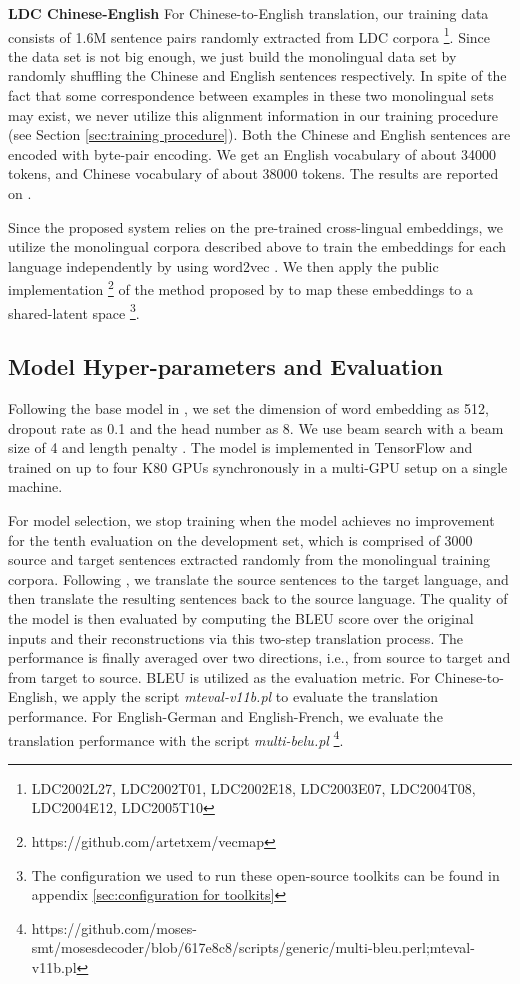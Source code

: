 \documentclass[11pt,a4paper]{article}
\begin{document}
\textbf{LDC Chinese-English} For Chinese-to-English translation, our training data consists of 1.6M sentence pairs randomly extracted from LDC corpora \footnote{LDC2002L27, LDC2002T01, LDC2002E18, LDC2003E07, LDC2004T08, LDC2004E12, LDC2005T10}. Since the data set is not big enough, we just build the monolingual data set by randomly shuffling the Chinese and English sentences respectively. In spite of the fact that some correspondence between examples in these two monolingual sets may exist, we never utilize this alignment information in our training procedure (see Section \ref{sec:training procedure}). Both the Chinese and English sentences are encoded with byte-pair encoding. We get an English vocabulary of about 34000 tokens, and Chinese vocabulary of about 38000 tokens. The results are reported on .

Since the proposed system relies on the pre-trained cross-lingual embeddings, we utilize the monolingual corpora described above to train the embeddings for each language independently by using word2vec \cite{mikolov2013distributed}. We then apply the public implementation \footnote{https://github.com/artetxem/vecmap} of the method proposed by \cite{Artetxe2017Learning} to map these embeddings to a shared-latent space \footnote{The configuration we used to run these open-source toolkits can be found in appendix \ref{sec:configuration for toolkits}}.

\subsection{Model Hyper-parameters and Evaluation}
Following the base model in \cite{Vaswani2017Attention}, we set the dimension of word embedding as 512, dropout rate as 0.1 and the head number as 8. We use beam search with a beam size of 4 and length penalty . The model is implemented in TensorFlow \cite{tensorflow2015-whitepaper} and trained on up to four K80 GPUs synchronously in a multi-GPU setup on a single machine.

For model selection, we stop training when the model achieves no improvement for the tenth evaluation on the development set, which is comprised of 3000 source and target sentences extracted randomly from the monolingual training corpora. Following \cite{Lample2017Unsupervised}, we translate the source sentences to the target language, and then translate the resulting sentences back to the source language. The quality of the model is then evaluated by computing the BLEU score over the original inputs and their reconstructions via this two-step translation process. The performance is finally averaged over two directions, i.e., from source to target and from target to source. BLEU \cite{papineni2002bleu:02} is utilized as the evaluation metric. For Chinese-to-English, we apply the script \emph{mteval-v11b.pl} to evaluate the translation performance. For English-German and English-French, we evaluate the translation performance with the script \emph{multi-belu.pl} \footnote{https://github.com/moses-smt/mosesdecoder/blob/617e8c8/scripts/generic/{multi-bleu.perl;mteval-v11b.pl}}.
\end{document}
